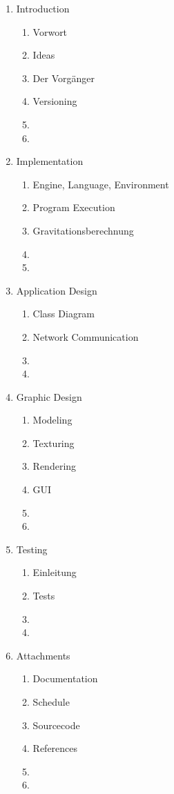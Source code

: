 \documentclass[a4paper]{article}
\begin{document}
\begin{enumerate}
  \item Introduction
  \begin{enumerate}
    \item Vorwort
    \item Ideas
    \item Der Vorgänger
    \item Versioning
    \item 
    \item 
  \end{enumerate}
  \item Implementation
  \begin{enumerate}
    \item Engine, Language, Environment
    \item Program Execution
    \item Gravitationsberechnung
    \item 
    \item 
  \end{enumerate}
  \item Application Design
  \begin{enumerate}
    \item Class Diagram
    \item Network Communication
    \item 
    \item 
  \end{enumerate}
  \item Graphic Design
  \begin{enumerate}
    \item Modeling
    \item Texturing
    \item Rendering
    \item GUI
    \item 
    \item 
  \end{enumerate}
  \item Testing
  \begin{enumerate}
    \item Einleitung
    \item Tests
    \item 
    \item 
  \end{enumerate}
  \item Attachments
  \begin{enumerate}
    \item Documentation
    \item Schedule
    \item Sourcecode
    \item References
    \item 
    \item 
  \end{enumerate}
\end{enumerate}
\end{document}

